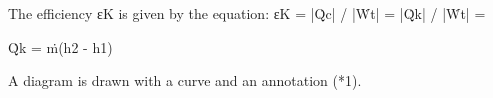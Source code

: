 The efficiency εK is given by the equation:
εK = |Q̇c| / |Ẇt| = |Q̇k| / |Ẇt| =

Q̇k = ṁ(h2 - h1)

A diagram is drawn with a curve and an annotation (*1).
